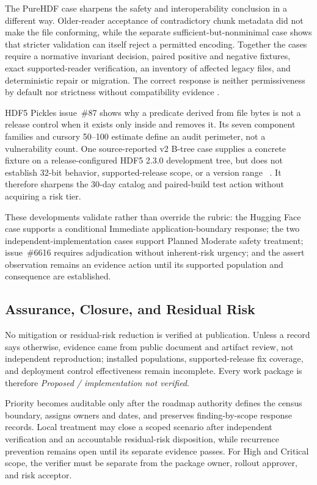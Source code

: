 \documentclass[../main.tex]{subfiles}
\begin{document}
The PureHDF case sharpens the safety and interoperability conclusion in a
different way. Older-reader acceptance of contradictory chunk metadata did not
make the file conforming, while the separate sufficient-but-nonminimal case
shows that stricter validation can itself reject a permitted encoding. Together
the cases require a normative invariant decision, paired positive and negative
fixtures, exact supported-reader verification, an inventory of affected legacy
files, and deterministic repair or migration. The correct response is neither
permissiveness by default nor strictness without compatibility evidence
\cite{hdf5-gh-issue-6409,hdf5-gh-pr-6432,hdf5-gh-issue-6534,
purehdf-gh-issue-164}.

HDF5 Pickles issue~\#87 shows why a predicate derived from file bytes is not a
release control when it exists only inside  and
 removes it. Its seven component families and cursory 50--100
estimate define an audit perimeter, not a vulnerability count. One
source-reported v2 B-tree case supplies a concrete  fixture on a
release-configured HDF5 2.3.0 development tree, but does not establish 32-bit
behavior, supported-release scope, or a version range
~\cite{h5lens-issue-87,h5policy-case-v2btree-recordsize}. It therefore
sharpens the 30-day catalog and paired-build test action without acquiring a
risk tier.

These developments validate rather than override the rubric: the Hugging Face
case supports a conditional Immediate application-boundary response; the two
independent-implementation cases support Planned Moderate safety treatment;
issue~\#6616 requires adjudication without inherent-risk urgency; and the
assert observation remains an evidence action until its supported population
and consequence are established.

\subsection{Assurance, Closure, and Residual Risk}

No mitigation or residual-risk reduction is verified at publication. Unless a
record says otherwise, evidence came from public document and artifact review,
not independent reproduction; installed populations, supported-release fix
coverage, and deployment control effectiveness remain incomplete. Every work
package is therefore \emph{Proposed / implementation not verified}.

Priority becomes auditable only after the roadmap authority defines the census
boundary, assigns owners and dates, and preserves finding-by-scope response
records. Local treatment may close a scoped scenario after independent
verification and an accountable residual-risk disposition, while recurrence
prevention remains open until its separate evidence passes. For High and
Critical scope, the verifier must be separate from the package owner, rollout
approver, and risk acceptor.
\end{document}
